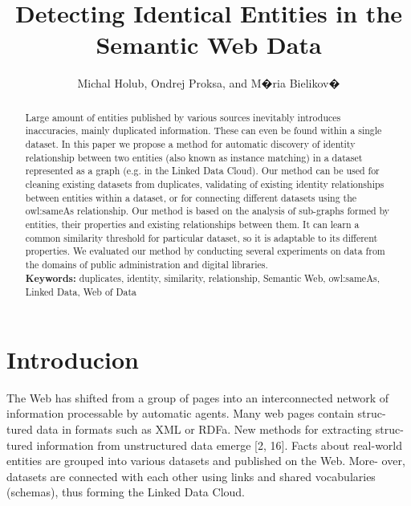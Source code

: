 \documentclass{llncs}
\begin{document}
\title{Detecting Identical Entities in the Semantic Web Data}


\author{Michal Holub, Ondrej Proksa, and M�ria Bielikov�}


\maketitle            

\begin{abstract}
Large amount of entities published by various sources inevitably
introduces inaccuracies, mainly duplicated information. These
can even be found within a single dataset. In this paper we propose
a method for automatic discovery of identity relationship between two
entities (also known as instance matching) in a dataset represented as
a graph (e.g. in the Linked Data Cloud). Our method can be used for
cleaning existing datasets from duplicates, validating of existing identity
relationships between entities within a dataset, or for connecting different
datasets using the owl:sameAs relationship. Our method is based on the
analysis of sub-graphs formed by entities, their properties and existing
relationships between them. It can learn a common similarity threshold
for particular dataset, so it is adaptable to its different properties. We
evaluated our method by conducting several experiments on data from
the domains of public administration and digital libraries.
\vspace{5mm} \\
\textbf {Keywords:} duplicates, identity, similarity, relationship, Semantic Web,
owl:sameAs, Linked Data, Web of Data
\end{abstract}

\section{Introducion}

The Web has shifted from a group of pages into an interconnected network of
information processable by automatic agents. Many web pages contain struc-
tured data in formats such as XML or RDFa. New methods for extracting struc-
tured information from unstructured data emerge [2, 16]. Facts about real-world
entities are grouped into various datasets and published on the Web. More-
over, datasets are connected with each other using links and shared vocabularies
(schemas), thus forming the Linked Data Cloud.
\end{document}
